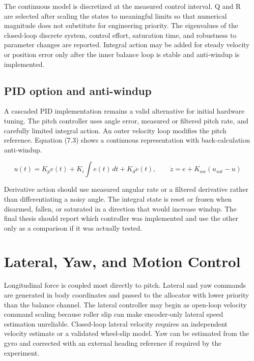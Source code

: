 The continuous model is discretized at the measured control interval. Q
and R are selected after scaling the states to meaningful limits so that
numerical magnitude does not substitute for engineering priority. The
eigenvalues of the closed-loop discrete system, control effort,
saturation time, and robustness to parameter changes are reported.
Integral action may be added for steady velocity or position error only
after the inner balance loop is stable and anti-windup is implemented.

\subsection{PID option and anti-windup}\label{pid-option-and-anti-windup}

A cascaded PID implementation remains a valid alternative for initial
hardware tuning. The pitch controller uses angle error, measured or
filtered pitch rate, and carefully limited integral action. An outer
velocity loop modifies the pitch reference. Equation (7.3) shows a
continuous representation with back-calculation anti-windup.

\begin{equation}
u(t)=K_p e(t)+K_i\!\int e(t)\,dt+K_d\dot{e}(t),\qquad
\dot{z}=e+K_{aw}\left(u_{sat}-u\right)
\label{eq:7-3}
\end{equation}

Derivative action should use measured angular rate or a filtered
derivative rather than differentiating a noisy angle. The integral state
is reset or frozen when disarmed, fallen, or saturated in a direction
that would increase windup. The final thesis should report which
controller was implemented and use the other only as a comparison if it
was actually tested.

\section{Lateral, Yaw, and Motion Control}\label{lateral-yaw-and-motion-control}

Longitudinal force is coupled most directly to pitch. Lateral and yaw
commands are generated in body coordinates and passed to the allocator
with lower priority than the balance channel. The lateral controller may
begin as open-loop velocity command scaling because roller slip can make
encoder-only lateral speed estimation unreliable. Closed-loop lateral
velocity requires an independent velocity estimate or a validated
wheel-slip model. Yaw can be estimated from the gyro and corrected with
an external heading reference if required by the experiment.

